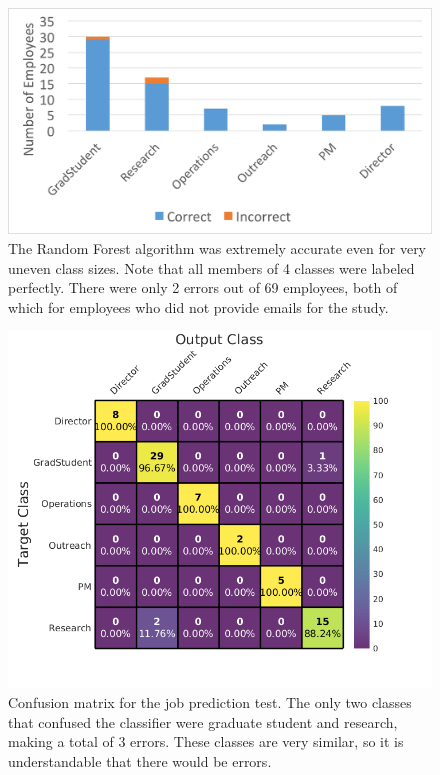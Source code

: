 \documentclass[12pt]{report}
\begin{document}
\begin{figure}[t]
    \centering
    \includegraphics[width=\columnwidth,trim={0mm 0mm 0mm 0mm},clip]{Prediction_50_50_RF}
    \vspace{-20pt}
    \caption[Job title classification results]{The Random Forest algorithm was extremely accurate even for very uneven class sizes.  Note that all members of 4 classes were labeled perfectly.  There were only 2 errors out of 69 employees, both of which for employees who did not provide emails for the study.}
    \label{fig:result_hist}
\end{figure}


\begin{figure}[t]
    \centering
        \includegraphics[width=.7\columnwidth,trim={0mm 0mm 0mm 0mm},clip]{Classification_confusion}
        \vspace{-7pt}
        \caption[Job title prediction confusion matrix]{Confusion matrix for the job prediction test.  The only two classes that confused the classifier were graduate student and research, making a total of 3 errors.  These classes are very similar, so it is understandable that there would be errors.}
        \label{fig:conf_matrix}
\end{figure}
\end{document}
